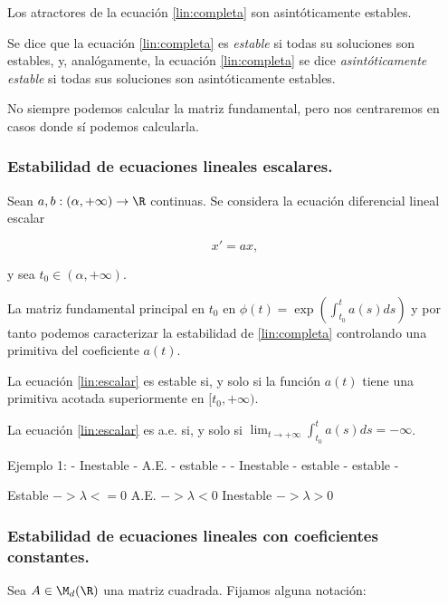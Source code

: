 \begin{ncor}
Los atractores de la ecuación \ref{lin:completa} son asintóticamente estables.
\end{ncor}

\begin{ndef}
Se dice que la ecuación \ref{lin:completa} es \emph{estable} si todas su soluciones son estables,
y, analógamente, la ecuación \ref{lin:completa} se dice \emph{asintóticamente estable} si todas sus soluciones son asintóticamente estables.
\end{ndef}

No siempre podemos calcular la matriz fundamental, pero nos centraremos en casos donde sí podemos calcularla.

\subsubsection{Estabilidad de ecuaciones lineales escalares.}

Sean $a,b:(\alpha,+\infty)\to \R$ continuas. Se considera la ecuación diferencial lineal escalar

\[
  x' = ax, \label{lin:escalar} \tag{l.e.}
\]

y sea $t_0\in(\alpha,+\infty)$.

La matriz fundamental principal en $t_0$ en $\phi(t)=\exp\left(\int^t_{t_0} a(s)ds\right)$ y por tanto podemos caracterizar la estabilidad de \ref{lin:completa} controlando una primitiva del coeficiente $a(t)$.
\begin{nprop}\hfill
\begin{nlist}
\item La ecuación \ref{lin:escalar} es estable si, y solo si la función $a(t)$ tiene una primitiva acotada superiormente en $[t_0,+\infty)$.
\item La ecuación \ref{lin:escalar} es a.e. si, y solo si $\lim_{t\to +\infty} \int^t_{t_0} a(s) ds = -\infty$.
\end{nlist}
\end{nprop}
Ejemplo 1:
- Inestable
- A.E.
- estable
-
- Inestable
- estable
- estable
-


Estable $-> \lambda <= 0$
A.E. $-> \lambda < 0$
Inestable $-> \lambda > 0$

\subsubsection{Estabilidad de ecuaciones lineales con coeficientes constantes.}
Sea $A \in \M_d(\R)$ una matriz cuadrada. Fijamos alguna notación:

